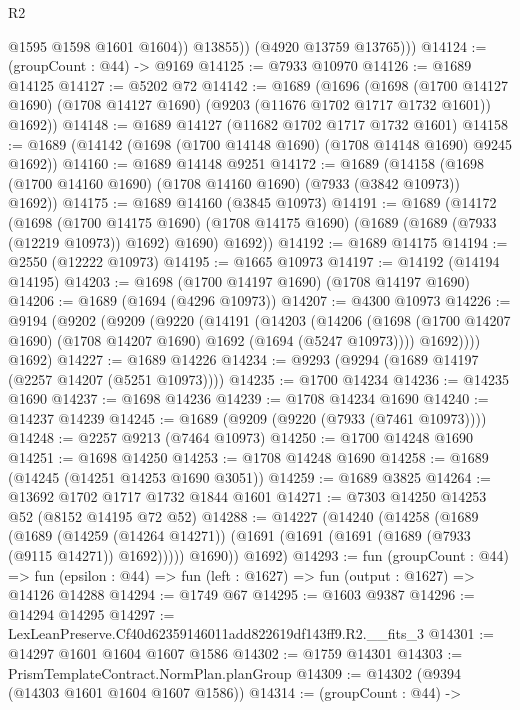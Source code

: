 \begin{lexlean}{R2}
\begin{coremodule}
                @1595
                @1598
                @1601
                @1604))
            @13855))
        (@4920 @13759 @13765)))
@14124 := (groupCount : @44) -> @9169
@14125 := @7933 @10970
@14126 := @1689 @14125
@14127 := @5202 @72
@14142 := @1689
    (@1696
      (@1698
        (@1700 @14127 @1690)
        (@1708 @14127 @1690)
        (@9203 (@11676 @1702 @1717 @1732 @1601))
        @1692))
@14148 := @1689 @14127 (@11682 @1702 @1717 @1732 @1601)
@14158 := @1689 (@14142 (@1698 (@1700 @14148 @1690) (@1708 @14148 @1690) @9245 @1692))
@14160 := @1689 @14148 @9251
@14172 := @1689
    (@14158 (@1698 (@1700 @14160 @1690) (@1708 @14160 @1690) (@7933 (@3842 @10973)) @1692))
@14175 := @1689 @14160 (@3845 @10973)
@14191 := @1689
    (@14172
      (@1698
        (@1700 @14175 @1690)
        (@1708 @14175 @1690)
        (@1689 (@1689 (@7933 (@12219 @10973)) @1692) @1690)
        @1692))
@14192 := @1689 @14175
@14194 := @2550 (@12222 @10973)
@14195 := @1665 @10973
@14197 := @14192 (@14194 @14195)
@14203 := @1698 (@1700 @14197 @1690) (@1708 @14197 @1690)
@14206 := @1689 (@1694 (@4296 @10973))
@14207 := @4300 @10973
@14226 := @9194
    (@9202
      (@9209
        (@9220
          (@14191
            (@14203
              (@14206
                (@1698 (@1700 @14207 @1690) (@1708 @14207 @1690) @1692 (@1694 (@5247 @10973))))
              @1692))))
      @1692)
@14227 := @1689 @14226
@14234 := @9293 (@9294 (@1689 @14197 (@2257 @14207 (@5251 @10973))))
@14235 := @1700 @14234
@14236 := @14235 @1690
@14237 := @1698 @14236
@14239 := @1708 @14234 @1690
@14240 := @14237 @14239
@14245 := @1689 (@9209 (@9220 (@7933 (@7461 @10973))))
@14248 := @2257 @9213 (@7464 @10973)
@14250 := @1700 @14248 @1690
@14251 := @1698 @14250
@14253 := @1708 @14248 @1690
@14258 := @1689 (@14245 (@14251 @14253 @1690 @3051))
@14259 := @1689 @3825
@14264 := @13692 @1702 @1717 @1732 @1844 @1601
@14271 := @7303 @14250 @14253 @52 (@8152 @14195 @72 @52)
@14288 := @14227
    (@14240
      (@14258
        (@1689
          (@1689
            (@14259 (@14264 @14271))
            (@1691 (@1691 (@1691 (@1689 (@7933 (@9115 @14271)) @1692)))))
          @1690))
      @1692)
@14293 := fun (groupCount : @44) =>
  fun (epsilon : @44) => fun (left : @1627) => fun (output : @1627) => @14126 @14288
@14294 := @1749 @67
@14295 := @1603 @9387
@14296 := @14294 @14295
@14297 := LexLeanPreserve.Cf40d62359146011add822619df143ff9.R2.__fits_3
@14301 := @14297 @1601 @1604 @1607 @1586
@14302 := @1759 @14301
@14303 := PrismTemplateContract.NormPlan.planGroup
@14309 := @14302 (@9394 (@14303 @1601 @1604 @1607 @1586))
@14314 := (groupCount : @44) ->

\end{coremodule}
\end{lexlean}
